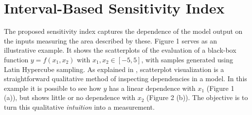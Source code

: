 \documentclass[twocolumn]{rps-esrel2022}
\begin{document}
\section{Interval-Based Sensitivity Index}

The proposed sensitivity index captures the dependence of the model output on the inputs measuring the area described by these. %
Figure 1 serves as an illustrative example.
It shows the scatterplots of the evaluation of a black-box function $y = f(x_1,x_2)$ with $x_1,x_2 \in [-5,5]$, with samples generated using Latin Hypercube sampling.
As explained in \cite{helton2003latin}, scatterplot visualization is a straightforward qualitative method of inspecting dependencies in a model.
In this example it is possible to see how $y$ has a linear dependence with $x_1$ (Figure 1 (a)), but shows little or no dependence with $x_2$ (Figure 2 (b)).
The objective is to turn this qualitative \textit{intuition} into a measurement.
\end{document}
